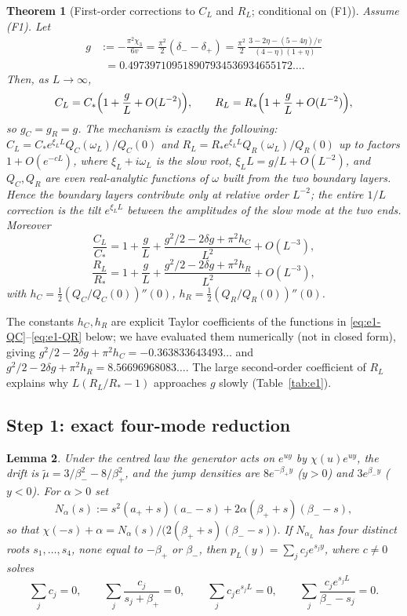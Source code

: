 \documentclass[11pt,a4paper]{article}
\newtheorem{theorem}{Theorem}[section]
\newtheorem{lemma}[theorem]{Lemma}
\theoremstyle{definition}
\theoremstyle{remark}
\newcommand{\1}{\mathbf 1}
\begin{document}
\begin{theorem}[First-order corrections to $C_L$ and $R_L$; conditional on (F1)]\label{thm:e1-CR}
Assume (F1). Let
\begin{align*}
g&:=-\frac{\pi^2\chi_3}{6v}=\frac{\pi^2}{2}(\delta_--\delta_+)
=\frac{\pi^2}{2}\,\frac{3-2\eta-(5-4\eta)/v}{(4-\eta)(1+\eta)}\\
&\phantom{:}=0.497397109518907934536934655172\ldots .
\end{align*}
Then, as $L\to\infty$,
\[
C_L=C_*\Bigl(1+\frac gL+O(L^{-2})\Bigr),\qquad
R_L=R_*\Bigl(1+\frac gL+O(L^{-2})\Bigr),
\]
so $g_C=g_R=g$. The mechanism is exactly the following: $C_L=C_*e^{\xi_LL}Q_C(\omega_L)/Q_C(0)$
and $R_L=R_*e^{\xi_LL}Q_R(\omega_L)/Q_R(0)$ up to factors $1+O(e^{-cL})$, where
$\xi_L+i\omega_L$ is the slow root, $\xi_LL=g/L+O(L^{-2})$, and $Q_C,Q_R$ are
\emph{even} real-analytic functions of $\omega$ built from the two boundary layers.
Hence the boundary layers contribute only at relative order $L^{-2}$; the entire
$1/L$ correction is the tilt $e^{\xi_LL}$ between the amplitudes of the slow mode at
the two ends. Moreover
\[
\frac{C_L}{C_*}=1+\frac gL+\frac{g^2/2-2\delta g+\pi^2h_C}{L^2}+O(L^{-3}),
\]
\[
\frac{R_L}{R_*}=1+\frac gL+\frac{g^2/2-2\delta g+\pi^2h_R}{L^2}+O(L^{-3}),
\]
with $h_{C}=\tfrac12 (Q_C/Q_C(0))''(0)$, $h_R=\tfrac12(Q_R/Q_R(0))''(0)$.
\end{theorem}

The constants $h_C,h_R$ are explicit Taylor coefficients of the functions in
\eqref{eq:e1-QC}--\eqref{eq:e1-QR} below; we have evaluated them numerically
(not in closed form), giving $g^2/2-2\delta g+\pi^2h_C=-0.363833643493\ldots$ and
$g^2/2-2\delta g+\pi^2h_R=8.56696968083\ldots$. The large second-order coefficient
of $R_L$ explains why $L(R_L/R_*-1)$ approaches $g$ slowly (Table~\ref{tab:e1}).

\subsection*{Step 1: exact four-mode reduction}

\begin{lemma}\label{lem:e1-modes}
Under the centred law the generator acts on $e^{uy}$ by $\chi(u)e^{uy}$, the drift is
$\tilde\mu=3/\beta_-^2-8/\beta_+^2$, and the jump densities are $8e^{-\beta_+y}$ ($y>0$)
and $3e^{\beta_-y}$ ($y<0$). For $\alpha>0$ set
\[
N_\alpha(s):=s^2(a_++s)(a_--s)+2\alpha(\beta_++s)(\beta_--s),
\]
so that $\chi(-s)+\alpha=N_\alpha(s)/\bigl(2(\beta_++s)(\beta_--s)\bigr)$.
If $N_{\alpha_L}$ has four distinct roots $s_1,\dots,s_4$, none equal to $-\beta_+$ or $\beta_-$,
then $p_L(y)=\sum_jc_je^{s_jy}$, where $c\neq0$ solves
\begin{equation}\label{eq:e1-bc}
\sum_jc_j=0,\qquad \sum_j\frac{c_j}{s_j+\beta_+}=0,\qquad
\sum_jc_je^{s_jL}=0,\qquad \sum_j\frac{c_je^{s_jL}}{\beta_--s_j}=0 .
\end{equation}
\end{lemma}
\end{document}
